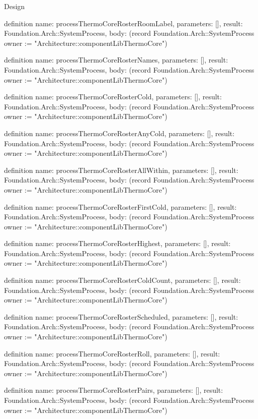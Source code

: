 \begin{lexlean}{Design}
\begin{semanticmodule}
definition{
  name: processThermoCoreRosterRoomLabel,
  parameters: [],
  result: Foundation.Arch::SystemProcess,
  body: (record Foundation.Arch::SystemProcess {owner := "Architecture::componentLibThermoCore"})
}

definition{
  name: processThermoCoreRosterNames,
  parameters: [],
  result: Foundation.Arch::SystemProcess,
  body: (record Foundation.Arch::SystemProcess {owner := "Architecture::componentLibThermoCore"})
}

definition{
  name: processThermoCoreRosterCold,
  parameters: [],
  result: Foundation.Arch::SystemProcess,
  body: (record Foundation.Arch::SystemProcess {owner := "Architecture::componentLibThermoCore"})
}

definition{
  name: processThermoCoreRosterAnyCold,
  parameters: [],
  result: Foundation.Arch::SystemProcess,
  body: (record Foundation.Arch::SystemProcess {owner := "Architecture::componentLibThermoCore"})
}

definition{
  name: processThermoCoreRosterAllWithin,
  parameters: [],
  result: Foundation.Arch::SystemProcess,
  body: (record Foundation.Arch::SystemProcess {owner := "Architecture::componentLibThermoCore"})
}

definition{
  name: processThermoCoreRosterFirstCold,
  parameters: [],
  result: Foundation.Arch::SystemProcess,
  body: (record Foundation.Arch::SystemProcess {owner := "Architecture::componentLibThermoCore"})
}

definition{
  name: processThermoCoreRosterHighest,
  parameters: [],
  result: Foundation.Arch::SystemProcess,
  body: (record Foundation.Arch::SystemProcess {owner := "Architecture::componentLibThermoCore"})
}

definition{
  name: processThermoCoreRosterColdCount,
  parameters: [],
  result: Foundation.Arch::SystemProcess,
  body: (record Foundation.Arch::SystemProcess {owner := "Architecture::componentLibThermoCore"})
}

definition{
  name: processThermoCoreRosterScheduled,
  parameters: [],
  result: Foundation.Arch::SystemProcess,
  body: (record Foundation.Arch::SystemProcess {owner := "Architecture::componentLibThermoCore"})
}

definition{
  name: processThermoCoreRosterRoll,
  parameters: [],
  result: Foundation.Arch::SystemProcess,
  body: (record Foundation.Arch::SystemProcess {owner := "Architecture::componentLibThermoCore"})
}

definition{
  name: processThermoCoreRosterPairs,
  parameters: [],
  result: Foundation.Arch::SystemProcess,
  body: (record Foundation.Arch::SystemProcess {owner := "Architecture::componentLibThermoCore"})
}


\end{semanticmodule}
\end{lexlean}

